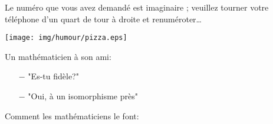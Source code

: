 	Le numéro que vous avez demandé est imaginaire ; veuillez tourner votre téléphone d'un quart de tour à droite et renuméroter…
	
	\begin{center}\underline{\hspace{5 cm}}\end{center}
	
	\begin{center}
		\texttt{[image: img/humour/pizza.eps]}	
	\end{center}
	\begin{center}\underline{\hspace{5 cm}}\end{center}
	
	Un mathématicien à son ami:

\begin{itemize}	 
	\item[$-$] "Es-tu fidèle?"

	\item[$-$] "Oui, à un isomorphisme près"
\end{itemize}

	\begin{center}\underline{\hspace{5 cm}}\end{center}
	
Comment les mathématiciens le font:

